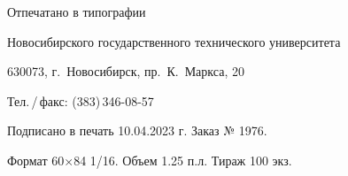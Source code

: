 
\newpage
\thispagestyle{empty}
\vspace*{0pt plus1fill}
\begin{center}   
    Отпечатано в типографии \par
    Новосибирского государственного технического университета \par   
    630073, г.~Новосибирск, пр.~К.~Маркса, 20 \par
    Тел.\,/\,факс: (383)\,346-08-57 \par
    Подписано в печать 10.04.2023 г. Заказ № 1976. \par
    Формат 60$\times$84 1/16. Объем 1.25 п.л. Тираж 100 экз.
\end{center}